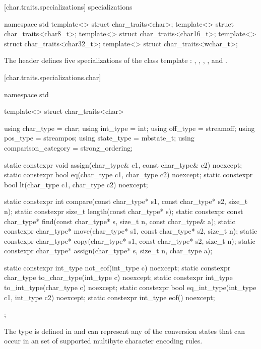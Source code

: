 [char.traits.specializations]{ specializations}

%
\begin{codeblock}
namespace std {
  template<> struct char_traits<char>;
  template<> struct char_traits<char8_t>;
  template<> struct char_traits<char16_t>;
  template<> struct char_traits<char32_t>;
  template<> struct char_traits<wchar_t>;
}
\end{codeblock}

\pnum
The header 
defines five specializations of the class template
:
,
,
,
,
and
.


[char.traits.specializations.char]{}

%
\begin{codeblock}
namespace std {
  template<> struct char_traits<char> {
    using char_type  = char;
    using int_type   = int;
    using off_type   = streamoff;
    using pos_type   = streampos;
    using state_type = mbstate_t;
    using comparison_category = strong_ordering;

    static constexpr void assign(char_type& c1, const char_type& c2) noexcept;
    static constexpr bool eq(char_type c1, char_type c2) noexcept;
    static constexpr bool lt(char_type c1, char_type c2) noexcept;

    static constexpr int compare(const char_type* s1, const char_type* s2, size_t n);
    static constexpr size_t length(const char_type* s);
    static constexpr const char_type* find(const char_type* s, size_t n,
                                           const char_type& a);
    static constexpr char_type* move(char_type* s1, const char_type* s2, size_t n);
    static constexpr char_type* copy(char_type* s1, const char_type* s2, size_t n);
    static constexpr char_type* assign(char_type* s, size_t n, char_type a);

    static constexpr int_type not_eof(int_type c) noexcept;
    static constexpr char_type to_char_type(int_type c) noexcept;
    static constexpr int_type to_int_type(char_type c) noexcept;
    static constexpr bool eq_int_type(int_type c1, int_type c2) noexcept;
    static constexpr int_type eof() noexcept;
  };
}
\end{codeblock}

\pnum
The type  is defined in 
and can represent any of the conversion states that can occur in an
 set of supported multibyte
character encoding rules.

